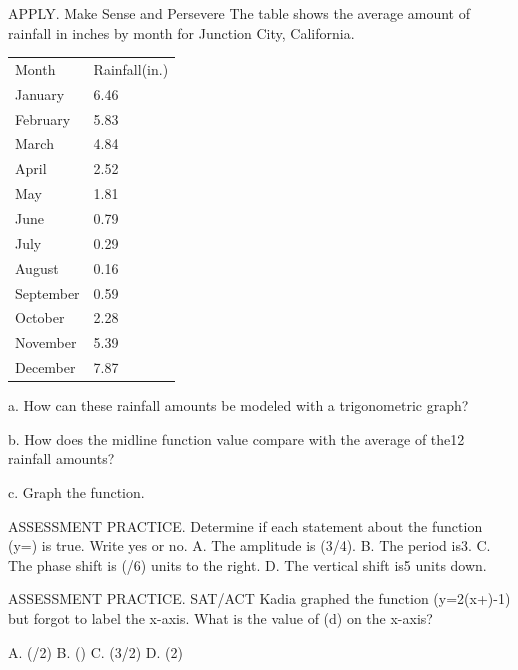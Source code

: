 \documentclass{article}
\newenvironment{practice}[2]{}{}        %
\newcommand{\answer}[1]{}               %
\newcommand{\placeholder}[2]{}          %
\begin{document}
\begin{practice}{25}{2}
APPLY. Make Sense and Persevere The table shows the average amount of rainfall in inches by month for Junction City, California.
\begin{tabular}{ll}
Month & Rainfall(in.) \\
January & 6.46 \\
February & 5.83 \\
March & 4.84 \\
April & 2.52 \\
May & 1.81 \\
June & 0.79 \\
July & 0.29 \\
August & 0.16 \\
September & 0.59 \\
October & 2.28 \\
November & 5.39 \\
December & 7.87 \\
\end{tabular}
\placeholder{illustration}{Cars in several lanes of a highway in rain,gray mountains and bridge background;yellow,orange,red,blue,white cars and rain streaks.}
a. How can these rainfall amounts be modeled with a trigonometric graph?
\answer{a.Answers may vary.Sample:(y=3.855\sin[\frac\pi6(x-10.5)]+4.015)}
b. How does the midline function value compare with the average of the12 rainfall amounts?
\answer{b.The average of the12 rainfall amounts,about3.236 inches,is close to the midline value,4.015 inches.}
c. Graph the function.
\answer{c.Graph shown.}
\placeholder{graph}{Red rainfall model,arrowed x,y axes,O; x labels4,8,12,16,grid2; y labels2,4,6,8,grid1;window-2..20,-2..10. Peaks near(1.5,7.87),(13.5,7.87),trough(7.5,.16),(19.5,.16),end arrows.}
\end{practice}
\begin{practice}{26}{2}
ASSESSMENT PRACTICE. Determine if each statement about the function (y=) is true. Write yes or no.
A. The amplitude is (3/4).
B. The period is3.
C. The phase shift is (\pi/6) units to the right.
D. The vertical shift is5 units down.
\answer{A.yes;B.no;C.no;D.yes}
\end{practice}
\begin{practice}{27}{2}
ASSESSMENT PRACTICE. SAT/ACT Kadia graphed the function (y=2\sin(x+\frac{})-1) but forgot to label the x-axis. What is the value of (d) on the x-axis?
\placeholder{graph}{Red2cos x-1 on grid,arrowed x,y axes,O; x letters a,b,c,d,e,f,g at successive pi/2 positions except origin: a=-pi,b=-pi/2,c=pi/2,d=pi,e=3pi/2,f=2pi,g=5pi/2. x gridpi/4;y labels-3,-2,-1,1,2,grid1/2;window-5pi/4..11pi/4,-4..5/2. Max(0,1),(2pi,1),min(-pi,-3),(pi,-3),end arrows.}
A. (\pi/2)
B. (\pi)
C. (3\pi/2)
D. (2\pi)
\answer{B}
\end{practice}
\end{document}
